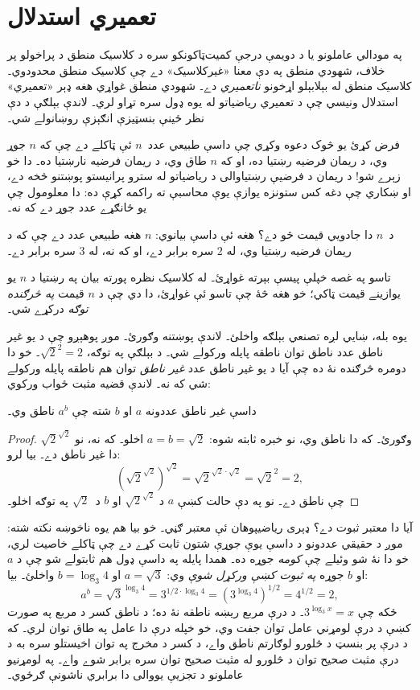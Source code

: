 \documentclass[../../../include/open-logic-chapter]{subfiles}
\begin{document}

\section{تعميري استدلال}

په مودالي عاملونو يا د دويمې درجې کميت‌ټاکونکو سره د کلاسيک منطق
د پراخولو پر خلاف، شهودي منطق په دې معنا «غيرکلاسيک» دے چې کلاسيک
منطق محدودوي۔ کلاسيک منطق له بېلابېلو اړخونو \emph{ناتعميري} دے۔
شهودي منطق غواړي هغه ډېر «تعميري» استدلال ونيسي چې د تعميري رياضياتو
له يوه ډول سره تړاو لري۔ لاندې بېلګې د دې نظر ځينې بنسټيزې انګېزې
روښانولے شي۔

فرض کړئ يو څوک دعوه وکړي چې داسې طبيعي عدد~$n$ ئې ټاکلے دے چې که
$n$ جوړ وي، د ريمان فرضيه رښتيا ده، او که $n$ طاق وي، د ريمان فرضيه
نارښتيا ده۔ دا خو زېرے شو!{} د ريمان د فرضيې رښتياوالی د رياضياتو له
سترو پرانيستو پوښتنو څخه دے، او ښکاري چې دغه کس ستونزه يوازې يوې
محاسبې ته راکمه کړې ده: دا معلومول چې يو ځانګړے عدد جوړ دے که نه۔

د~$n$ دا جادويي قيمت څو دے؟ هغه ئې داسې بيانوي: $n$ هغه طبيعي عدد
دے چې که د ريمان فرضيه رښتيا وي، له $2$ سره برابر دے، او که نه، له
$3$ سره برابر دے۔

تاسو په غصه خپلې پيسې بېرته غواړئ۔ له کلاسيک نظره پورته بيان په رښتيا
د $n$ يو يوازينے قيمت ټاکي؛ خو هغه څۀ چې تاسو ئې غواړئ، دا دي چې د
$n$ قيمت \emph{په څرګنده توګه} درکړے شي۔

يوه بله، ښايي لږه تصنعي بېلګه واخلئ۔ لاندې پوښتنه وګورئ۔ موږ پوهېږو
چې د يو غير ناطق عدد ناطق توان ناطقه پايله ورکولے شي۔ د
بېلګې په توګه، $\sqrt{2}^2 = 2$۔ خو دا دومره څرګنده نۀ ده چې آيا
د يو غير ناطق عدد \emph{غير ناطق} توان هم ناطقه پايله ورکولے
شي که نه۔ لاندې قضيه مثبت ځواب ورکوي:

\begin{thm}
داسې غير ناطق عددونه $a$ او $b$ شته چې $a^b$ ناطق وي۔
\end{thm}

\begin{proof}
$\sqrt{2}^{\sqrt{2}}$ وګورئ۔ که دا ناطق وي، نو خبره ثابته شوه:
$a = b = \sqrt{2}$ اخلو۔ که نه، نو دا غير ناطق دے۔ بيا لرو:
\[
(\sqrt{2}^{\sqrt{2}})^{\sqrt{2}} = \sqrt{2}^{\sqrt{2} \cdot
  \sqrt{2}} = \sqrt{2}^2 = 2,
\]
چې ناطق دے۔ نو په دې حالت کښې $a$ د
$\sqrt{2}^{\sqrt{2}}$ او $b$ د~$\sqrt 2$ په توګه اخلو۔
\end{proof}

آيا دا معتبر ثبوت دے؟ ډېری رياضيپوهان ئې معتبر ګڼي۔ خو بيا هم يوه
ناخوښه نکته شته: موږ د حقيقي عددونو د داسې يوې جوړې شتون ثابت کړے دے
چې ټاکلے خاصيت لري، خو دا نۀ شو وئيلے چې \emph{کومه} جوړه ده۔ همدا
پايله په داسې ډول هم ثابتولے شو چې د $a$ او $b$ جوړه \emph{په ثبوت کښې
ورکړل شوې} وي: $a = \sqrt{3}$ او $b = \log_3 4$ واخلئ۔ بيا:
\[
a^b = \sqrt{3}^{\log_3 4} = 3^{1/2 \cdot \log_3 4} = (3^{\log_3
  4})^{1/2} = 4^{1/2}= 2,
\]
ځکه چې $3^{\log_3 x} = x$۔ د درې مربع ريښه ناطقه نۀ ده؛
د ناطق کسر د مربع په صورت کښې د درې لومړني عامل توان جفت وي،
خو خپله درې دا عامل په طاق توان لري۔ که د درې پر بنسټ د څلورو
لوګارتم ناطق واے، د کسر د مخرج په توان اخيستلو سره به د درې
مثبت صحيح توان د څلورو له مثبت صحيح توان سره برابر شوے واے۔
په لومړنيو عاملونو د تجزيې يووالی دا برابري ناشونې ګرځوي۔
\end{document}
